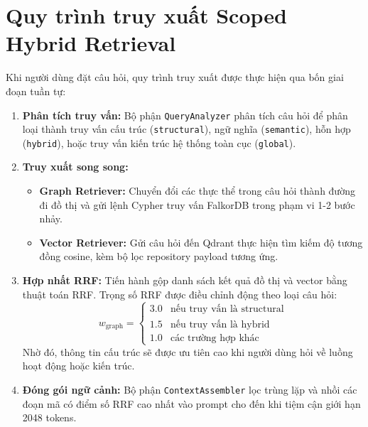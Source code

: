 \documentclass[12pt,a4paper,oneside]{report}
\begin{document}
\section{Quy trình truy xuất Scoped Hybrid Retrieval}
Khi người dùng đặt câu hỏi, quy trình truy xuất được thực hiện qua bốn giai đoạn tuần tự:
\begin{enumerate}
    \item \textbf{Phân tích truy vấn:} Bộ phận \texttt{QueryAnalyzer} phân tích câu hỏi để phân loại thành truy vấn cấu trúc (\texttt{structural}), ngữ nghĩa (\texttt{semantic}), hỗn hợp (\texttt{hybrid}), hoặc truy vấn kiến trúc hệ thống toàn cục (\texttt{global}).
    \item \textbf{Truy xuất song song:}
    \begin{itemize}
        \item \textbf{Graph Retriever:} Chuyển đổi các thực thể trong câu hỏi thành đường đi đồ thị và gửi lệnh Cypher truy vấn FalkorDB trong phạm vi 1-2 bước nhảy.
        \item \textbf{Vector Retriever:} Gửi câu hỏi đến Qdrant thực hiện tìm kiếm độ tương đồng cosine, kèm bộ lọc repository payload tương ứng.
    \end{itemize}
    \item \textbf{Hợp nhất RRF:} Tiến hành gộp danh sách kết quả đồ thị và vector bằng thuật toán RRF. Trọng số RRF được điều chỉnh động theo loại câu hỏi:
    \begin{equation}
        w_{\text{graph}} = \begin{cases} 
        3.0 & \text{nếu truy vấn là structural} \\
        1.5 & \text{nếu truy vấn là hybrid} \\
        1.0 & \text{các trường hợp khác}
        \end{cases}
    \end{equation}
    Nhờ đó, thông tin cấu trúc sẽ được ưu tiên cao khi người dùng hỏi về luồng hoạt động hoặc kiến trúc.
    \item \textbf{Đóng gói ngữ cảnh:} Bộ phận \texttt{ContextAssembler} lọc trùng lặp và nhồi các đoạn mã có điểm số RRF cao nhất vào prompt cho đến khi tiệm cận giới hạn 2048 tokens.
\end{enumerate}

\newpage

\end{document}
